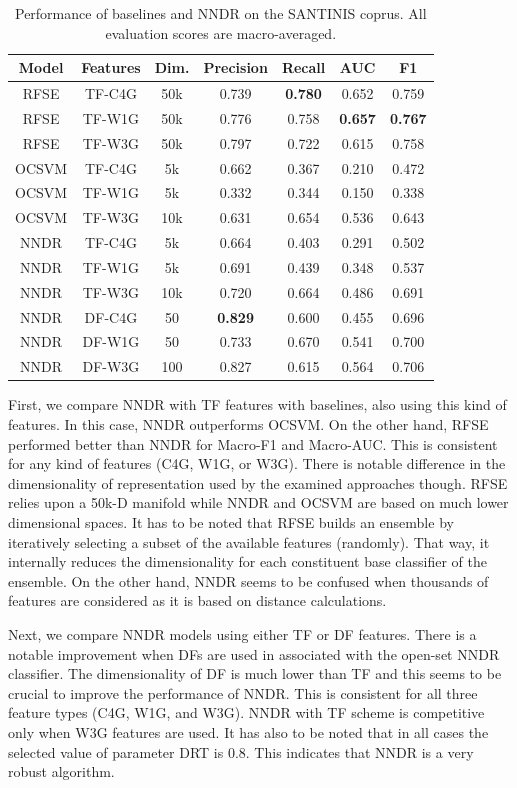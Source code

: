 \documentclass[runningheads]{llncs}
\begin{document}
\begin{table}[t]
\center
\caption {Performance of baselines and NNDR on the SANTINIS coprus. All evaluation scores are macro-averaged.}
\label{tbl:results}
\begin{tabular}{ccccccc}
\hline
Model & Features & Dim. & Precision & Recall & AUC & F1 \\
\hline
RFSE & TF-C4G & 50k & 0.739 & \textbf{0.780} & 0.652 & 0.759 \\
RFSE & TF-W1G & 50k & 0.776 & 0.758 & \textbf{0.657} & \textbf{0.767} \\
RFSE & TF-W3G & 50k & 0.797 & 0.722 & 0.615 & 0.758 \\
OCSVM & TF-C4G & 5k & 0.662 & 0.367 & 0.210 & 0.472\\
OCSVM & TF-W1G & 5k & 0.332 & 0.344 & 0.150 & 0.338\\
OCSVM & TF-W3G & 10k & 0.631 & 0.654 & 0.536 & 0.643\\
NNDR & TF-C4G & 5k & 0.664 & 0.403 & 0.291 & 0.502 \\
NNDR & TF-W1G & 5k & 0.691 & 0.439 & 0.348 & 0.537 \\
NNDR & TF-W3G & 10k & 0.720 & 0.664 & 0.486 & 0.691 \\
NNDR & DF-C4G & 50 & \textbf{0.829} & 0.600 & 0.455 & 0.696 \\
NNDR & DF-W1G & 50 & 0.733 & 0.670 & 0.541 & 0.700 \\
NNDR & DF-W3G & 100 & 0.827 & 0.615 & 0.564 & 0.706 \\
\hline
\end{tabular}
\end{table}

First, we compare NNDR with TF features with baselines,  also using this kind of features. In this case, NNDR outperforms OCSVM. On the other hand, RFSE performed better than NNDR for Macro-F1 and Macro-AUC. This is consistent for any kind of features (C4G, W1G, or W3G). There is notable difference in the dimensionality of representation used by the examined approaches though. RFSE relies upon a 50k-D manifold while NNDR and OCSVM are based on much lower dimensional spaces. It has to be noted that RFSE builds an ensemble by iteratively selecting a subset of the available features (randomly). That way, it internally reduces the dimensionality for each constituent base classifier of the ensemble. On the other hand, NNDR seems to be confused when thousands of features are considered as it is based on distance calculations. 

Next, we compare NNDR models using either TF or DF features. There is a notable improvement when DFs are used in associated with the open-set NNDR classifier. The dimensionality of DF is much lower than TF and this seems to be crucial to improve the performance of NNDR. This is consistent for all three feature types (C4G, W1G, and W3G). NNDR with TF scheme is competitive only when W3G features are used. It has also to be noted that in all cases the selected value of parameter DRT is 0.8. This indicates that NNDR is a very robust algorithm.
\end{document}
